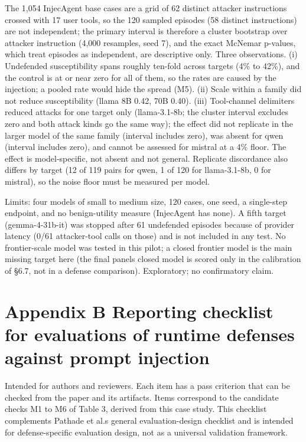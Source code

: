 \documentclass[9pt]{extarticle}
\begin{document}


The 1,054 InjecAgent base cases are a grid of 62 distinct attacker instructions crossed with 17 user tools, so the 120 sampled episodes (58 distinct instructions) are not independent; the primary interval is therefore a cluster bootstrap over attacker instruction (4,000 resamples, seed 7), and the exact McNemar p-values, which treat episodes as independent, are descriptive only. Three observations. (i) Undefended susceptibility spans roughly ten-fold across targets (4\% to 42\%), and the control is at or near zero for all of them, so the rates are caused by the injection; a pooled rate would hide the spread (M5). (ii) Scale within a family did not reduce susceptibility (llama 8B 0.42, 70B 0.40). (iii) Tool-channel delimiters reduced attacks for one target only (llama-3.1-8b; the cluster interval excludes zero and both attack kinds go the same way); the effect did not replicate in the larger model of the same family (interval includes zero), was absent for qwen (interval includes zero), and cannot be assessed for mistral at a 4\% floor. The effect is model-specific, not absent and not general. Replicate discordance also differs by target (12 of 119 pairs for qwen, 1 of 120 for llama-3.1-8b, 0 for mistral), so the noise floor must be measured per model.

Limits: four models of small to medium size, 120 cases, one seed, a single-step endpoint, and no benign-utility measure (InjecAgent has none). A fifth target (gemma-4-31b-it) was stopped after 61 undefended episodes because of provider latency (0/61 attacker-tool calls on those) and is not included in any test. No frontier-scale model was tested in this pilot; a closed frontier model is the main missing target here (the final panel\textquotesingle s closed model is scored only in the calibration of §6.7, not in a defense comparison). Exploratory; no confirmatory claim.

\section{Appendix B Reporting checklist for evaluations of runtime defenses against prompt injection}

Intended for authors and reviewers. Each item has a pass criterion that can be checked from the paper and its artifacts. Items correspond to the candidate checks M1 to M6 of Table 3, derived from this case study. This checklist complements Pathade et al.\textquotesingle s general evaluation-design checklist and is intended for defense-specific evaluation design, not as a universal validation framework.
\end{document}
